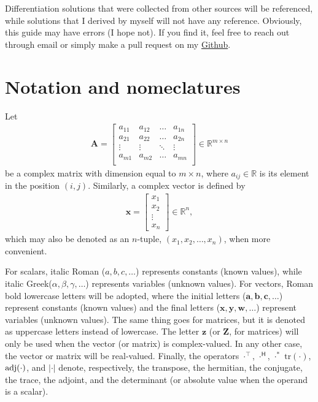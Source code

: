 \documentclass{article}
\newcommand{\trans}{\top}
\newcommand{\hermit}{\mathsf{H}}
\newcommand\abs[1]{\left\lvert#1\right\rvert}
\begin{document}
Differentiation solutions that were collected from other sources will be referenced, while solutions that I derived by myself will not have any reference. Obviously, this guide may have errors (I hope not). If you find it, feel free to reach out through email or simply make a pull request on my \href{https://github.com/tapyu/tapyu.github.io/tree/master/notes/posts/matrix_diff_ref/latex}{Github}.

\section{Notation and nomeclatures}
\label{sec:notation}

Let
\begin{align}
    \mathbf{A} = \begin{bmatrix}
        a_{11} & a_{12} & \dots & a_{1n} \\
        a_{21} & a_{22} & \dots & a_{2n} \\
        \vdots & \vdots & \ddots & \vdots \\
        a_{m1} & a_{m2} & \dots & a_{mn} \\
    \end{bmatrix} \in \mathbb{R}^{m \times n}
\end{align}
be a complex matrix with dimension equal to \(m \times n\), where \(a_{ij} \in \mathbb{R}\) is its element in the position \((i,j)\). Similarly, a complex vector is defined by
\begin{align}
    \mathbf{x} = \begin{bmatrix}
        x_1 \\
        x_2 \\
        \vdots \\
        x_n
    \end{bmatrix}  \in \mathbb{R}^{n},
\end{align}
which may also be denoted as an \(n\)-tuple, \((x_1, x_2, \dots, x_n)\), when more convenient.

For scalars, italic Roman (\(a,b,c,\dots\)) represents constants (known values), while italic Greek\linebreak (\(\alpha, \beta, \gamma, \dots\)) represents variables (unknown values). For vectors, Roman bold lowercase letters will be adopted, where the initial letters (\(\mathbf{a}, \mathbf{b}, \mathbf{c}, \dots\)) represent constants (known values) and the final letters (\(\mathbf{x}, \mathbf{y}, \mathbf{w}, \dots\)) represent variables (unknown values). The same thing goes for matrices, but it is denoted as uppercase letters instead of lowercase. The letter \(\mathbf{z}\) (or \(\mathbf{Z}\), for matrices) will only be used when the vector (or matrix) is complex-valued. In any other case, the vector or matrix will be real-valued. Finally, the operators \(\cdot^{\trans}\), \(\cdot^{\hermit}\), \(\cdot^*\) \(\text{tr}(\cdot)\), \(\textnormal{adj}(\cdot)\), and \(\abs{\cdot}\) denote, respectively, the transpose, the hermitian, the conjugate, the trace, the adjoint, and the determinant (or absolute value when the operand is a scalar).
\end{document}
